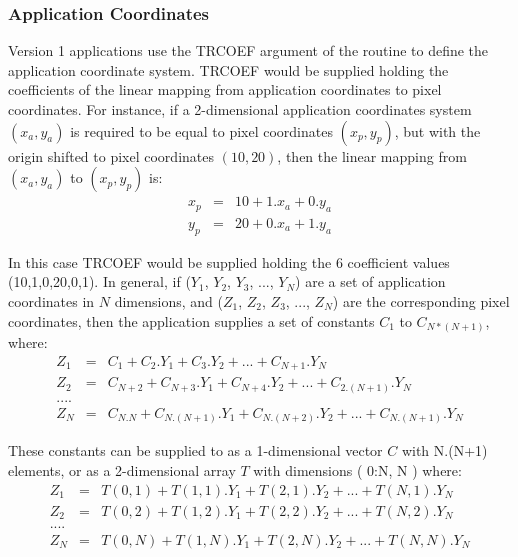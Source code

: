 \documentclass[11pt]{starlink}
\begin{document}
\subsubsection{Application Coordinates}
Version 1 applications use the TRCOEF argument of the 
routine to define the application coordinate system. TRCOEF would be supplied
holding the
coefficients of the linear mapping from application coordinates to pixel
coordinates. For instance, if a 2-dimensional application coordinates system
$(x_{a},y_{a})$ is required to be equal to pixel coordinates $(x_{p},y_{p})$,
but with the origin shifted to pixel coordinates $(10,20)$, then the linear
mapping from $(x_{a},y_{a})$ to $(x_{p},y_{p})$ is:
\small
\begin{eqnarray*}
x_{p} & = & 10 + 1.x_{a} + 0.y_{a} \\
y_{p} & = & 20 + 0.x_{a} + 1.y_{a}
\end{eqnarray*}
\normalsize

In this case TRCOEF would be supplied holding the 6 coefficient values
(10,1,0,20,0,1). In general, if ($Y_{1}$, $Y_{2}$, $Y_{3}$, ..., $Y_{N}$) are a
set of application coordinates in $N$ dimensions, and ($Z_{1}$, $Z_{2}$,
$Z_{3}$, ..., $Z_{N}$) are the corresponding pixel coordinates, then the
application supplies a set of constants $C_{1}$ to $C_{N*(N+1)}$, where:
\small
\begin{eqnarray*}
Z_{1} & = & C_{1} + C_{2}.Y_{1} + C_{3}.Y_{2} + ... + C_{N+1}.Y_{N} \\
Z_{2} & = & C_{N+2} + C_{N+3}.Y_{1} + C_{N+4}.Y_{2} + ... + C_{2.(N+1)}.Y_{N} \\
 ....\\
Z_{N} & = & C_{N.N} + C_{N.(N+1)}.Y_{1} + C_{N.(N+2)}.Y_{2} + ... + C_{N.(N+1)}.Y_{N}
\end{eqnarray*}
\normalsize

These constants can be supplied to  as a 1-dimensional vector
$C$ with N.(N+1) elements, or as a 2-dimensional array $T$ with dimensions
( 0:N, N ) where:
\small
\begin{eqnarray*}
Z_{1} & = & T(0,1) + T(1,1).Y_{1} + T(2,1).Y_{2} + ... + T(N,1).Y_{N} \\
Z_{2} & = & T(0,2) + T(1,2).Y_{1} + T(2,2).Y_{2} + ... + T(N,2).Y_{N} \\
 ....\\
Z_{N} & = & T(0,N) + T(1,N).Y_{1} + T(2,N).Y_{2} + ... + T(N,N).Y_{N}
\end{eqnarray*}
\normalsize
\end{document}
